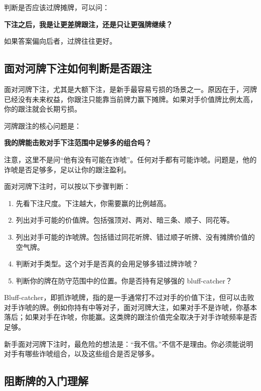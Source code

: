 判断是否应该过牌摊牌，可以问：

\begin{center}
\textbf{下注之后，我是让更差牌跟注，还是只让更强牌继续？}
\end{center}

如果答案偏向后者，过牌往往更好。

\subsection{面对河牌下注如何判断是否跟注}

面对河牌下注，尤其是大额下注，是新手最容易亏损的场景之一。原因在于，河牌已经没有未来权益，你跟注只能靠当前牌力赢下摊牌。如果对手价值牌比例太高，你的跟注就会长期亏损。

河牌跟注的核心问题是：

\begin{center}
\textbf{我的牌能击败对手下注范围中足够多的组合吗？}
\end{center}

注意，这里不是问“他有没有可能在诈唬”。任何对手都有可能诈唬。问题是，他的诈唬是否足够多，足以让你的跟注盈利。

面对河牌下注时，可以按以下步骤判断：

\begin{enumerate}
\item 先看下注尺度。下注越大，你需要赢的比例越高。
\item 列出对手可能的价值牌。包括强顶对、两对、暗三条、顺子、同花等。
\item 列出对手可能的诈唬牌。包括错过同花听牌、错过顺子听牌、没有摊牌价值的空气牌。
\item 判断对手类型。这个对手是否真的会用足够多错过牌诈唬？
\item 判断你的牌在防守范围中的位置。你是否持有足够强的 bluff-catcher？
\end{enumerate}

Bluff-catcher，即抓诈唬牌，指的是一手通常打不过对手的价值下注，但可以击败对手诈唬的牌。例如你持有中等对子，面对河牌大注，如果对手不是诈唬，你基本落后；如果对手在诈唬，你能赢。这类牌的跟注价值完全取决于对手诈唬频率是否足够。

新手面对河牌下注时，最危险的想法是：“我不信。”不信不是理由。你必须能说明对手有哪些诈唬组合，以及这些组合是否足够多。

\subsection{阻断牌的入门理解}

